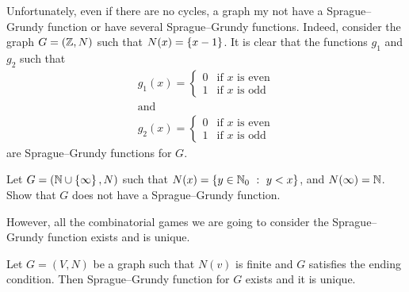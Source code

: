 Unfortunately, even if there are no cycles, a graph my not have a
Sprague--Grundy function or have several Sprague--Grundy functions. Indeed,
consider the graph $G = ({\mathbb{Z}}, N)$ such that $N(x) = \set{x - 1}$. It is clear
that the functions $g_1$ and $g_2$ such that
\begin{gather*}
    g_1(x) =
    \begin{cases}
        0 & \text{if } x \text{ is even} \\
        1 & \text{if } x \text{ is odd}
    \end{cases} \\
    \text{and} \\
    g_2(x) =
    \begin{cases}
        0 & \text{if } x \text{ is even} \\
        1 & \text{if } x \text{ is odd}
    \end{cases}
\end{gather*}
are Sprague--Grundy functions for $G$.

\begin{exercise}
    Let $G = (\N \cup \set{\infty}, N)$ such that 
    $N(x) = \set[y < x]{y \in \N_0}$, and $N(\infty) = {\mathbb{N}}$.
    Show that $G$ does not have a Sprague--Grundy function.
\end{exercise}

However, all the combinatorial games we are going to consider
the Sprague--Grundy function exists and is unique.
\begin{theorem}
\label{theorem:ending-condition-sg-function}
  Let $G = (V, N)$ be a graph such that $N(v)$ is finite and $G$ satisfies the
  ending condition. Then Sprague--Grundy function for $G$ exists and it is
  unique.
\end{theorem}

